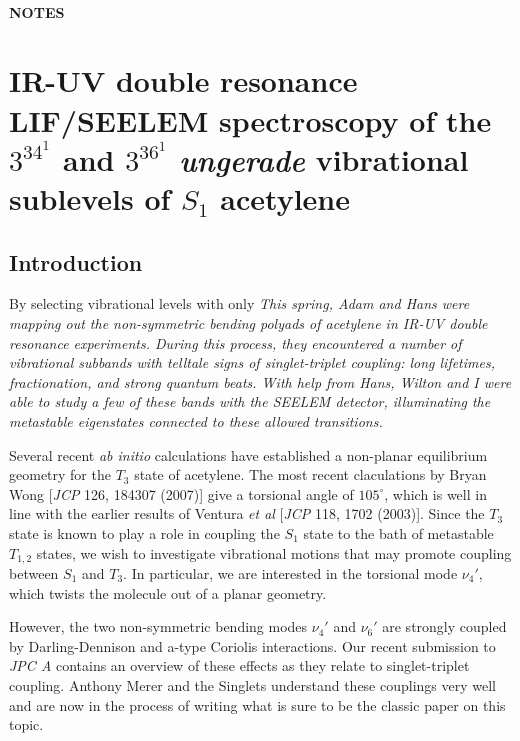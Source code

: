 \documentclass[12pt]{mitthesis}
\begin{document}
\tableofcontents
\clearpage

\subsubsection*{NOTES}
\clearpage

\chapter{IR-UV double resonance LIF/SEELEM spectroscopy of the
  $3^34^1$ and $3^36^1$ \emph{ungerade} vibrational sublevels of $S_1$
  acetylene}

\section{Introduction}



 By selecting vibrational levels with only 
\emph{This spring, Adam and Hans were mapping out the non-symmetric
  bending polyads of acetylene in IR-UV double resonance experiments.
  During this process, they encountered a number of vibrational
  subbands with telltale signs of singlet-triplet coupling: long
  lifetimes, fractionation, and strong quantum beats.  With help from
  Hans, Wilton and I were able to study a few of these bands with the
  SEELEM detector, illuminating the metastable eigenstates connected
  to these allowed transitions.}


Several recent \emph{ab initio} calculations have established a
non-planar equilibrium geometry for the $T_3$ state of acetylene.  The
most recent claculations by Bryan Wong [\emph{JCP} 126, 184307 (2007)]
give a torsional angle of $105^\circ$, which is well in line with the
earlier results of Ventura \emph{et al} [\emph{JCP} 118, 1702 (2003)].
Since the $T_3$ state is known to play a role in coupling the $S_1$
state to the bath of metastable $T_{1,2}$ states, we wish to
investigate vibrational motions that may promote coupling between
$S_1$ and $T_3$.  In particular, we are interested in the torsional
mode $\nu_4'$, which twists the molecule out of a planar geometry.

However, the two non-symmetric bending modes $\nu_4'$ and $\nu_6'$ are
strongly coupled by Darling-Dennison and a-type Coriolis interactions.
Our recent submission to \emph{JPC A} contains an overview of these
effects as they relate to singlet-triplet coupling.  Anthony Merer and
the Singlets understand these couplings very well and are now in the
process of writing what is sure to be the classic paper on this topic.
\end{document}
